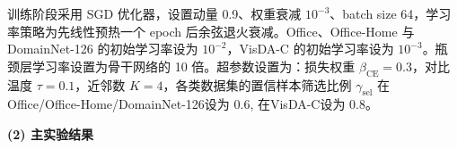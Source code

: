 训练阶段采用 SGD 优化器，设置动量 0.9、权重衰减 $10^{-3}$、batch size 64，学习率策略为先线性预热一个 epoch 后余弦退火衰减。Office、Office-Home 与 DomainNet-126 的初始学习率设为 $10^{-2}$，VisDA-C 的初始学习率设为 $10^{-3}$。瓶颈层学习率设置为骨干网络的 10 倍。超参数设置为：损失权重 $\beta_{\text{CE}} = 0.3$，对比温度 $\tau = 0.1$，近邻数 $K = 4$，各类数据集的置信样本筛选比例 $\gamma_{\text{sel}}$ 在Office/Office-Home/DomainNet-126设为 0.6, 在VisDA-C设为 0.8。

\noindent\textbf{(2) 主实验结果}

\begin{table}[!htbp]
  \vspace{0.5em}\centering\wuhao
  

\end{table}

